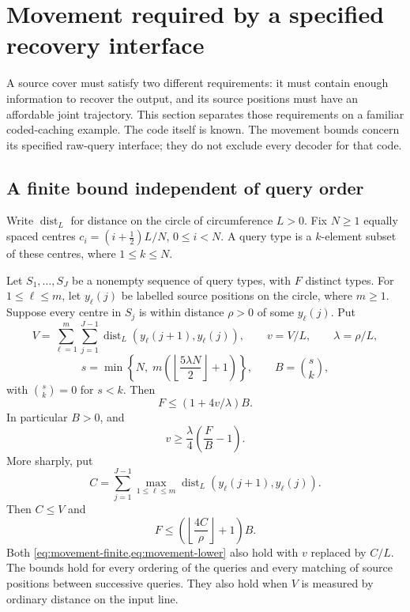 \section{Movement required by a specified recovery interface}
\label{sec:movement}

A source cover must satisfy two different requirements: it must contain
enough information to recover the output, and its source positions must
have an affordable joint trajectory.  This section separates those
requirements on a familiar coded-caching example.  The code itself is
known.  The movement bounds concern its specified raw-query interface;
they do not exclude every decoder for that code.

\subsection{A finite bound independent of query order}

Write $\operatorname{dist}_L$ for distance on the circle of circumference
$L>0$.  Fix $N\ge1$ equally spaced centres
$c_i=(i+\tfrac12)L/N$, $0\le i<N$.  A query type is a $k$-element subset
of these centres, where $1\le k\le N$.

\begin{theorem}
\label{thm:movement}
Let $S_1,\ldots,S_J$ be a nonempty sequence of query types, with $F$
distinct types.  For $1\le\ell\le m$, let $y_\ell(j)$ be labelled source
positions on the circle, where $m\ge1$.  Suppose every centre in $S_j$
is within distance $\rho>0$ of some $y_\ell(j)$.  Put
\[
 V=\sum_{\ell=1}^{m}\sum_{j=1}^{J-1}
       \operatorname{dist}_L(y_\ell(j+1),y_\ell(j)),\qquad
 v=V/L,\qquad \lambda=\rho/L,
\]
\[
 s=\min\left\{N,\;m\left(\left\lfloor\frac{5\lambda N}{2}
                                  \right\rfloor+1\right)\right\},
 \qquad B=\binom{s}{k},
\]
with $\binom{s}{k}=0$ for $s<k$.  Then
\begin{equation}
 F\le (1+4v/\lambda)B.
 \label{eq:movement-finite}
\end{equation}
In particular $B>0$, and
\begin{equation}
 v\ge\frac{\lambda}{4}\left(\frac{F}{B}-1\right).
 \label{eq:movement-lower}
\end{equation}
More sharply, put
\[
 C=\sum_{j=1}^{J-1}\max_{1\le\ell\le m}
       \operatorname{dist}_L(y_\ell(j+1),y_\ell(j)).
\]
Then $C\le V$ and
\[
 F\le\left(\left\lfloor\frac{4C}{\rho}\right\rfloor+1\right)B.
\]
Both \cref{eq:movement-finite,eq:movement-lower} also hold with $v$
replaced by $C/L$.
The bounds hold for every ordering of the queries and every matching of
source positions between successive queries.  They also hold when $V$
is measured by ordinary distance on the input line.
\end{theorem}

